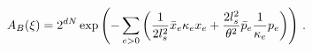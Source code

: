 \begin{equation}
A_{B}(\xi )=2^{dN}\exp \left( -\sum_{e>0}\left( \frac{1}{2l_{s}^{2}}\bar{x}%
_{e}\kappa _{e}x_{e}+\frac{2l_{s}^{2}}{\theta ^{2}}\bar{p}_{e}{\frac{1}{%
\kappa _{e}}}p_{e}\right) \right)\,.
\end{equation}

